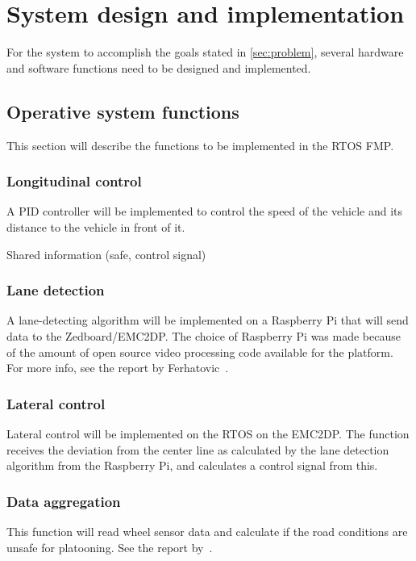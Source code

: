 \chapter{System design and implementation}
\label{sec:system_design}
For the system to accomplish the goals stated in \ref{sec:problem}, several hardware and software functions need to be designed and implemented.\\


\section{Operative system functions}
This section will describe the functions to be implemented in the RTOS FMP.

\subsection{Longitudinal control}
A PID controller will be implemented to control the speed of the vehicle and its distance to the vehicle in front of it.

Shared information (safe, control signal)

\subsection{Lane detection}
A lane-detecting algorithm will be implemented on a Raspberry Pi that will send data to the Zedboard/EMC2DP. The choice of Raspberry Pi was made because of the amount of open source video processing code available for the platform. For more info, see the report by Ferhatovic~\cite{ferhatovic2017}.

\subsection{Lateral control}
Lateral control will be implemented on the RTOS on the EMC2DP. The function receives the deviation from the center line as calculated by the lane detection algorithm from the Raspberry Pi, and calculates a control signal from this.

\subsection{Data aggregation}
This function will read wheel sensor data and calculate if the road conditions are unsafe for platooning. See the report by~\cite{hellman2017}.

